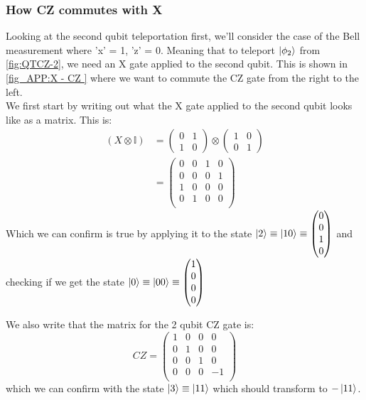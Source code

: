 \subsubsection{How CZ commutes with X}\label{sec:CZ commute X}
Looking at the second qubit teleportation first, we'll consider the case of the Bell measurement where 'x' = 1, 'z' = 0. Meaning that to teleport $\ket{\phi_2}$ from \ref{fig:QTCZ-2}, we need an X gate applied to the second qubit. This is shown in \ref{fig_APP:X - CZ } where we want to commute the CZ gate from the right to the left.
\\
We first start by writing out what the X gate applied to the second qubit looks like as a matrix. This is:
\begin{align}
    (X \otimes\mathbb{I}) & = 
    \begin{pmatrix}
    0 & 1\\ 
    1 & 0
    \end{pmatrix} 
    \otimes
    \begin{pmatrix}
    1 & 0\\ 
    0 & 1
    \end{pmatrix}
    \\
    & = 
    \begin{pmatrix}
    0 & 0 & 1 & 0\\ 
    0 & 0 & 0 & 1\\
    1 & 0 & 0 & 0\\
    0 & 1 & 0 & 0\\
\end{pmatrix} \label{X tens I}
\end{align}
Which we can confirm is true by applying it to the state $ \ket{2} \equiv \ket{10} \equiv 
\begin{pmatrix}
    0 \\ 
    0\\
    1\\
    0\\
\end{pmatrix}$ and checking if we get the state $\ket{0} \equiv \ket{00} \equiv 
\begin{pmatrix}
    1 \\ 
    0\\
    0\\
    0\\
\end{pmatrix}$
\par
 We also write that the matrix for the 2 qubit CZ gate is:
\begin{equation}
    CZ = 
    \begin{pmatrix}
    1 & 0 & 0 & 0 \\ 
    0 & 1 & 0 & 0 \\
    0 & 0 & 1 & 0 \\
    0 & 0 & 0 & -1\\
    \end{pmatrix}
\end{equation} which we can confirm with the state $\ket{3} \equiv \ket{11}$ which should transform to $-\ket{11}$.


